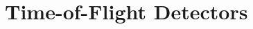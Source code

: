 \graphicspath{{02-TOF/Figures/}}


\newcommand{\mchange}[2]{{\color{red}#1}{\color{green}#2}}
\newcommand{\malert}[1]{{\it\color{red}#1}}
\newcommand{\hilite}[1]{{\it\color{blue}#1}}
\newcommand{\Tzero}{\ensuremath{T0}}
\newcommand{\Gauss}{\ensuremath{\text{G}}}
\newcommand{\DT}{\ensuremath{\Delta T}}
\newcommand{\us}{\ensuremath{\mu\text{s}}}

\section{Time-of-Flight Detectors}
\label{Sect:TOF}




